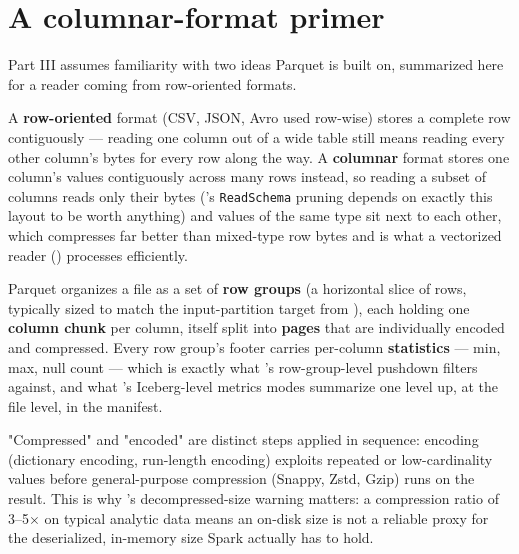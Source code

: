 \section{A columnar-format primer}
\label{sec:refenv-columnar}

Part III assumes familiarity with two ideas Parquet is built on, summarized
here for a reader coming from row-oriented formats.

A \textbf{row-oriented} format (CSV, JSON, Avro used row-wise) stores a
complete row contiguously --- reading one column out of a wide table still
means reading every other column's bytes for every row along the way. A
\textbf{columnar} format stores one column's values contiguously across many
rows instead, so reading a subset of columns reads only their bytes
('s \texttt{ReadSchema} pruning depends on exactly
this layout to be worth anything) and values of the same type sit next to
each other, which compresses far better than mixed-type row bytes and is
what a vectorized reader () processes
efficiently.

Parquet organizes a file as a set of \textbf{row groups} (a horizontal slice
of rows, typically sized to match the input-partition target from
), each holding one \textbf{column chunk} per column,
itself split into \textbf{pages} that are individually encoded and
compressed. Every row group's footer carries per-column \textbf{statistics}
--- min, max, null count --- which is exactly what 's
row-group-level pushdown filters against, and what
's Iceberg-level metrics modes summarize one
level up, at the file level, in the manifest.

\begin{note}
"Compressed" and "encoded" are distinct steps applied in sequence: encoding
(dictionary encoding, run-length encoding) exploits repeated or low-cardinality
values before general-purpose compression (Snappy, Zstd, Gzip) runs on the
result. This is why 's decompressed-size warning matters:
a compression ratio of 3--5$\times$ on typical analytic data means an
on-disk size is not a reliable proxy for the deserialized, in-memory size
Spark actually has to hold.
\end{note}
